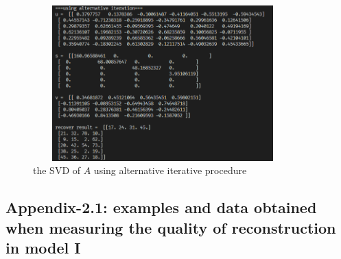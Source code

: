 \begin{figure}[H]
    \centering
    \includegraphics[height=60mm, width=100mm]{Example_result_alternative.png}
    \caption{the SVD of $A$ using alternative iterative procedure}
\end{figure}
\subsection{Appendix-2.1: examples and data obtained when measuring the quality of reconstruction in model I}
